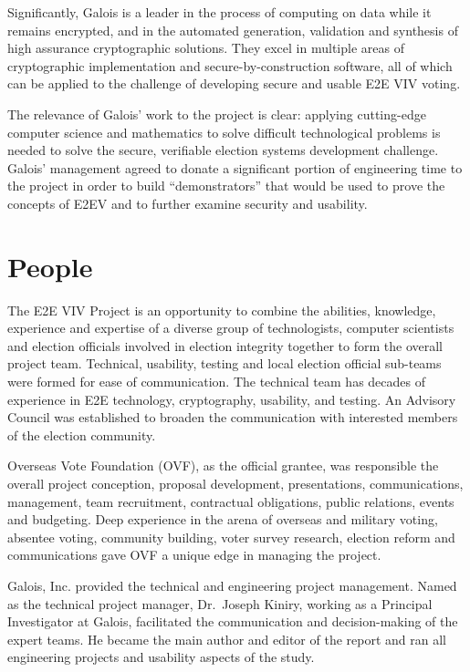 Significantly, Galois is a leader in the process of computing on data
while it remains encrypted, and in the automated generation,
validation and synthesis of high assurance cryptographic
solutions. They excel in multiple areas of cryptographic
implementation and secure-by-construction software, all of which can
be applied to the challenge of developing secure and usable E2E VIV
voting.

The relevance of Galois’ work to the project is clear: applying
cutting-edge computer science and mathematics to solve difficult
technological problems is needed to solve the secure, verifiable
election systems development challenge. Galois’ management agreed to
donate a significant portion of engineering time to the project in
order to build “demonstrators” that would be used to prove the
concepts of E2EV and to further examine security and usability.

\section{People}
\label{sec:people}

The E2E VIV Project is an opportunity to combine the abilities,
knowledge, experience and expertise of a diverse group of
technologists, computer scientists and election officials involved in
election integrity together to form the overall project
team. Technical, usability, testing and local election official
sub-teams were formed for ease of communication. The technical team
has decades of experience in E2E technology, cryptography, usability,
and testing. An Advisory Council was established to broaden the
communication with interested members of the election community.

Overseas Vote Foundation (OVF), as the official grantee, was
responsible the overall project conception, proposal development,
presentations, communications, management, team recruitment,
contractual obligations, public relations, events and budgeting. Deep
experience in the arena of overseas and military voting, absentee
voting, community building, voter survey research, election reform and
communications gave OVF a unique edge in managing the project.

Galois, Inc. provided the technical and engineering project
management. Named as the technical project manager, Dr.~Joseph Kiniry,
working as a Principal Investigator at Galois, facilitated the
communication and decision-making of the expert teams. He became the
main author and editor of the report and ran all engineering projects
and usability aspects of the study.

